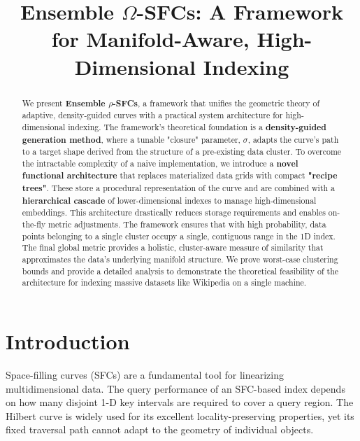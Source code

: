 \documentclass[sigconf]{acmart}
\begin{document}
\title{Ensemble $\Omega$-SFCs: A Framework for Manifold-Aware, High-Dimensional Indexing}


\begin{abstract}
We present \textbf{Ensemble $\rho$-SFCs}, a framework that unifies the geometric theory of adaptive, density-guided curves with a practical system architecture for high-dimensional indexing. The framework's theoretical foundation is a \textbf{density-guided generation method}, where a tunable "closure" parameter, $\sigma$, adapts the curve's path to a target shape derived from the structure of a pre-existing data cluster. To overcome the intractable complexity of a naive implementation, we introduce a \textbf{novel functional architecture} that replaces materialized data grids with compact \textbf{"recipe trees"}. These store a procedural representation of the curve and are combined with a \textbf{hierarchical cascade} of lower-dimensional indexes to manage high-dimensional embeddings. This architecture drastically reduces storage requirements and enables on-the-fly metric adjustments. The framework ensures that with high probability, data points belonging to a single cluster occupy a single, contiguous range in the 1D index. The final global metric provides a holistic, cluster-aware measure of similarity that approximates the data's underlying manifold structure. We prove worst-case clustering bounds and provide a detailed analysis to demonstrate the theoretical feasibility of the architecture for indexing massive datasets like Wikipedia on a single machine.
\end{abstract}

\maketitle

\section{Introduction}
Space-filling curves (SFCs) are a fundamental tool for linearizing multidimensional data. The query performance of an SFC-based index depends on how many disjoint 1-D key intervals are required to cover a query region. The Hilbert curve is widely used for its excellent locality-preserving properties, yet its fixed traversal path cannot adapt to the geometry of individual objects.
\end{document}
